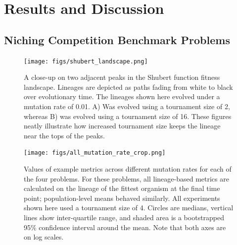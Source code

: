 \documentclass[letterpaper]{article}
\newcommand{\reduceCaptionPadding}{\setlength{\belowcaptionskip}{-10pt}}
\begin{document}
\section{Results and Discussion}

\subsection{Niching Competition Benchmark Problems}

\begin{figure}
\centering
\texttt{[image: figs/shubert\_landscape.png]}
\reduceCaptionPadding
\caption{\small A close-up on two adjacent peaks in the Shubert function fitness landscape. Lineages are depicted as paths fading from white to black over evolutionary time. The lineages shown here evolved under a mutation rate of 0.01. A) Was evolved using a tournament size of 2, whereas B) was evolved using a tournament size of 16. These figures neatly illustrate how increased tournament size keeps the lineage near the tops of the peaks.}
\label{fig:lineageviz}
\end{figure}


\begin{figure}
\centering
\texttt{[image: figs/all\_mutation\_rate\_crop.png]}
\reduceCaptionPadding
\caption{\small Values of example metrics across different mutation rates for each of the four problems. For these problems, all lineage-based metrics are calculated on the lineage of the fittest organism at the final time point; %
population-level means behaved similarly. All experiments shown here used a tournament size of 4. Circles are medians, vertical lines show inter-quartile range, and shaded area is a bootstrapped 95\% confidence interval around the mean. Note that both axes are on log scales.}
\label{fig:mutation_rate}
\end{figure}
\end{document}
